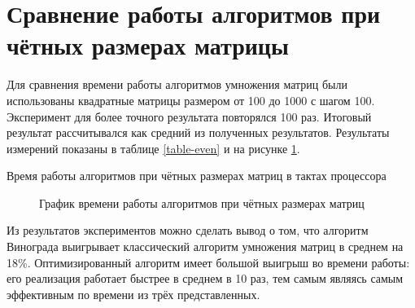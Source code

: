 \documentclass[12pt, a4paper]{report}
\begin{document}
	\section{Сравнение работы алгоритмов при чётных размерах матрицы}
	Для сравнения времени работы алгоритмов умножения матриц были использованы квадратные матрицы размером от 100 до 1000 с шагом 100. Эксперимент для более точного результата повторялся 100 раз. Итоговый результат рассчитывался как средний из полученных результатов. Результаты измерений показаны в таблице \ref{table-even} и на рисунке \ref{graph-even}.\\
	\begin{table}[ht!]
		\caption{Время работы алгоритмов при чётных размерах матриц в тактах процессора}
		\label{table-even}
		\begin{center}
		\end{center}
	\end{table}
	
	\begin{figure}[ht!]
		\caption{График времени работы алгоритмов при чётных размерах матриц}
		\label{graph-even}
	\end{figure}

	\newpage
	
	Из результатов экспериментов можно сделать вывод о том, что алгоритм Винограда выигрывает классический алгоритм умножения матриц в среднем на 18\%. Оптимизированный алгоритм имеет большой выигрыш во времени работы: его реализация работает быстрее в среднем в 10 раз, тем самым являясь самым эффективным по времени из трёх представленных.
	
\end{document}
